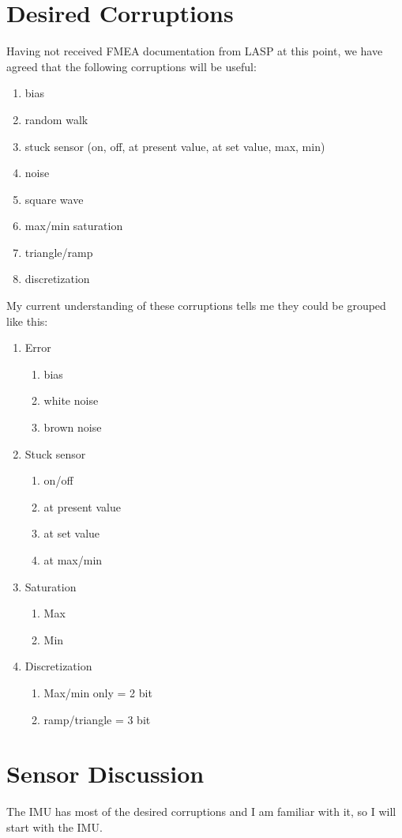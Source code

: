 \documentclass[]{BasiliskReportMemo}
\begin{document}
\section{Desired Corruptions}
Having not received FMEA documentation from LASP at this point, we have agreed that the following corruptions will be useful:
\begin{enumerate}
	\item bias
	\item random walk
	\item stuck sensor (on, off, at present value, at set value, max, min)
	\item noise
	\item square wave
	\item max/min saturation
	\item triangle/ramp
	\item discretization
\end{enumerate}
My current understanding of these corruptions tells me they could be grouped like this:
\begin{enumerate}
	\item Error
	\begin{enumerate}
		\item bias
		\item white noise
		\item brown noise
	\end{enumerate}
	\item Stuck sensor
	\begin{enumerate}
		\item on/off
		\item at present value
		\item at set value
		\item at max/min
	\end{enumerate}
		\item Saturation
		\begin{enumerate}
			\item Max
			\item Min
		\end{enumerate}
	\item Discretization
		\begin{enumerate}
			\item Max/min only = 2 bit
			\item ramp/triangle = 3 bit
		\end{enumerate}
\end{enumerate}

\section{Sensor Discussion}
The IMU has most of the desired corruptions and I am familiar with it, so I will start with the IMU.
\end{document}
